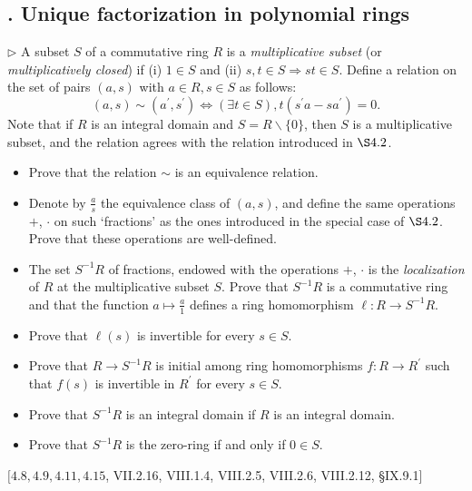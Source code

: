 \subsection{. Unique factorization in polynomial rings}
\hypertarget{Exercise V.4.7}{}
\begin{problem}[4.7]
$\triangleright$ A subset $S$ of a commutative ring $R$ is a \emph{multiplicative subset} (or \emph{multiplicatively closed}) if (i) $1 \in S$ and (ii) $s, t \in S \Longrightarrow s t \in S$. Define a relation on the set of pairs $(a, s)$ with $a \in R, s \in S$ as follows:
$$
(a, s) \sim\left(a^{\prime}, s^{\prime}\right) \Longleftrightarrow(\exists t \in S), t\left(s^{\prime} a-s a^{\prime}\right)=0 .
$$
Note that if $R$ is an integral domain and $S=R \backslash\{0\}$, then $S$ is a multiplicative subset, and the relation agrees with the relation introduced in $\S 4.2$.
\begin{itemize}
    \item Prove that the relation $\sim$ is an equivalence relation.
    \item Denote by $\frac{a}{s}$ the equivalence class of $(a, s)$, and define the same operations $+$, $\cdot$ on such `fractions' as the ones introduced in the special case of $\S 4.2$. Prove that these operations are well-defined.
    \item The set $S^{-1} R$ of fractions, endowed with the operations $+$, $\cdot$ is the \emph{localization} of $R$ at the multiplicative subset $S$. Prove that $S^{-1} R$ is a commutative ring and that the function $a \mapsto \frac{a}{1}$ defines a ring homomorphism $\ell: R \rightarrow S^{-1} R$.
    \item Prove that $\ell(s)$ is invertible for every $s \in S$.
    \item Prove that $R \rightarrow S^{-1} R$ is initial among ring homomorphisms $f: R \rightarrow R^{\prime}$ such that $f(s)$ is invertible in $R^{\prime}$ for every $s \in S$.
    \item Prove that $S^{-1} R$ is an integral domain if $R$ is an integral domain.
    \item Prove that $S^{-1} R$ is the zero-ring if and only if $0 \in S$.
\end{itemize}
$[4.8,4.9,4.11,4.15$, VII.2.16, VIII.1.4, VIII.2.5, VIII.2.6, VIII.2.12, §IX.9.1]
\end{problem}
